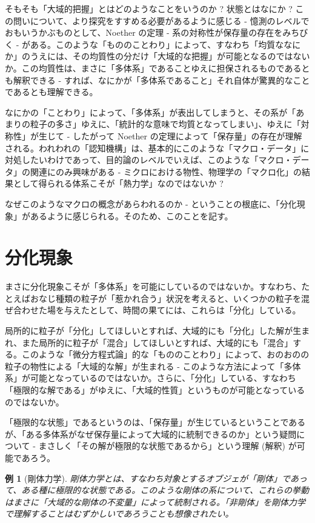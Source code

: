 \documentclass{jsarticle}
\theoremstyle{break}
\newtheorem{ex}[thm]{例}
\begin{document}
そもそも「大域的把握」とはどのようなことをいうのか ? 状態とはなにか ? この問いについて、より探究をすすめる必要があるように感じる - 憶測のレベルでおもいうかぶものとして、Noether の定理 - 系の対称性が保存量の存在をみちびく - がある。このような「もののことわり」によって、すなわち「均質ななにか」のうえには、その均質性の分だけ「大域的な把握」が可能となるのではないか。この均質性は、まさに「多体系」であることゆえに担保されるものであるとも解釈できる - すれば、なにかが「多体系であること」それ自体が驚異的なことであるとも理解できる。

なにかの「ことわり」によって、「多体系」が表出してしまうと、その系が「あまりの粒子の多さ」ゆえに、「統計的な意味で均質となってしまい」、ゆえに「対称性」が生じて - したがって Noether の定理によって「保存量」の存在が理解される。われわれの「認知機構」は、基本的にこのような「マクロ・データ」に対処したいわけであって、目的論のレベルでいえば、このような「マクロ・データ」の関連にのみ興味がある - ミクロにおける物性、物理学の「マクロ化」の結果として得られる体系こそが「熱力学」なのではないか ?

なぜこのようなマクロの概念があらわれるのか - ということの根底に、「分化現象」があるように感じられる。そのため、このことを記す。

\section{分化現象}

まさに分化現象こそが「多体系」を可能にしているのではないか。すなわち、たとえばおなじ種類の粒子が「惹かれ合う」状況を考えると、いくつかの粒子を混ぜ合わせた場を与えたとして、時間の果てには、これらは「分化」している。

局所的に粒子が「分化」してほしいとすれば、大域的にも「分化」した解が生まれ、また局所的に粒子が「混合」してほしいとすれば、大域的にも「混合」する。このような「微分方程式論」的な「もののことわり」によって、おのおのの粒子の物性による「大域的な解」が生まれる - このような方法によって「多体系」が可能となっているのではないか。さらに、「分化」している、すなわち「極限的な解である」がゆえに、「大域的性質」というものが可能となっているのではないか。

「極限的な状態」であるというのは、「保存量」が生じているということであるが、「ある多体系がなぜ保存量によって大域的に統制できるのか」という疑問について - まさしく「その解が極限的な状態であるから」という理解 (解釈) が可能であろう。

\begin{ex}[剛体力学]
剛体力学とは、すなわち対象とするオブジェが「剛体」であって、ある種に極限的な状態である。このような剛体の系について、これらの挙動はまさに「大域的な剛体の不変量」によって統制される。「非剛体」を剛体力学で理解することはむずかしいであろうことも想像されたい。
\end{ex}
\end{document}
